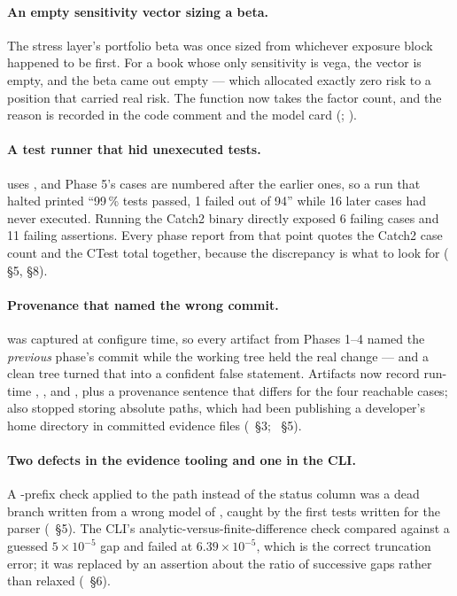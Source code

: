 \documentclass[11pt,a4paper]{article}
\begin{document}
\paragraph{An empty sensitivity vector sizing a beta.} The stress layer's portfolio beta was
once sized from whichever exposure block happened to be first. For a book whose only
sensitivity is vega, the  vector is empty, and the beta came out empty --- which
allocated exactly zero risk to a position that carried real risk. The function now takes the
factor count, and the reason is recorded in the code comment and the model card
(; ).

\paragraph{A test runner that hid unexecuted tests.}  uses
, and Phase 5's cases are numbered after the earlier ones, so a run
that halted printed ``99\,\% tests passed, 1 failed out of 94'' while 16 later cases had never
executed. Running the Catch2 binary directly exposed 6 failing cases and 11 failing assertions.
Every phase report from that point quotes the Catch2 case count and the CTest total together,
because the discrepancy is what to look for (
\S5, \S8).

\paragraph{Provenance that named the wrong commit.}  was captured at
configure time, so every artifact from Phases 1--4 named the \emph{previous} phase's commit
while the working tree held the real change --- and a clean tree turned that into a confident
false statement. Artifacts now record run-time , ,
 and , plus a provenance sentence that
differs for the four reachable cases;  also stopped storing absolute
paths, which had been publishing a developer's home directory in committed evidence files
(~\S3;
~\S5).

\paragraph{Two defects in the evidence tooling and one in the CLI.} A
\code{!!}-prefix check applied to the path instead of the status column was a dead branch
written from a wrong model of , caught by the first tests written
for the parser (~\S5). The CLI's
analytic-versus-finite-difference check compared against a guessed $5\times 10^{-5}$ gap and
failed at $6.39\times 10^{-5}$, which is the correct truncation error; it was replaced by an
assertion about the ratio of successive gaps rather than relaxed
(~\S6).
\end{document}
